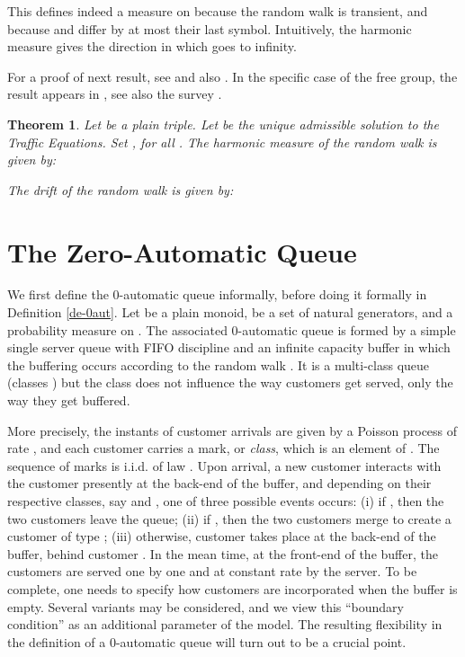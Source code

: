 \documentclass[11pt,a4paper]{article}
\newtheorem{theorem}{Theorem}[section]
\theoremstyle{remark}
\begin{document}
This defines indeed a measure on  because the random walk
is transient, and because  and  differ by at
most their last symbol.
Intuitively, the harmonic measure  gives the direction in which 
goes to infinity.

For a proof of next result, see \cite[Theorem 4.5]{mair04} and also
\cite[Theorem 3.3]{MaMa}. In
the specific case of the free group, the result appears in
\cite{DyMa,SaSt}, see also the survey \cite{ledr00}.

\begin{theorem}\label{th-rw}
Let  be a plain triple. Let
 be the unique
  admissible solution to the Traffic Equations.
Set , for all
. The harmonic measure  of the random
walk  is given by:

The drift of the random walk is given by:

\end{theorem}

\section{The Zero-Automatic Queue}\label{se-0autq}

We first define the 0-automatic queue informally, before doing it
formally in Definition \ref{de-0aut}. 
Let  be a plain monoid,  be a set of natural
generators, and  a probability measure on . 
The associated
0-automatic queue is formed by a simple single server queue with
FIFO discipline and an infinite capacity buffer in which the
buffering occurs according to the random walk . It is a
multi-class queue (classes ) but the class does not
influence the way customers get served, only the way they get
buffered.

\medskip

More precisely, the instants of customer arrivals are given by a
Poisson process of rate , and each customer carries a
mark, or {\em class}, which is an element of . The
sequence of marks is i.i.d. of law . Upon arrival, a new
customer interacts with the customer presently at the back-end of
the buffer, and depending on their respective classes, say  and
, one of three possible events occurs: (i) if ,
then the two customers leave the queue; (ii) if , then the two customers merge to create a customer of type
; (iii) otherwise, customer  takes place at the back-end of
the buffer, behind customer . In the mean time, at the
front-end of the buffer, the customers are served one by one and
at constant rate  by the server. To be complete, one needs to
specify how customers are incorporated when the buffer is empty.
Several variants may be considered, and we view this ``boundary
condition'' as an additional parameter of the model.
The resulting flexibility in the definition of a 0-automatic queue
will turn out to be a crucial point.
\end{document}
